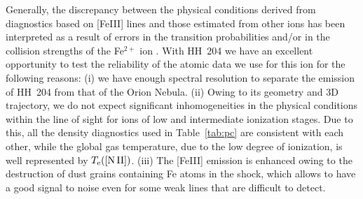 \documentclass[twocolumn]{aastex63}
\begin{document}
Generally, the discrepancy between the physical conditions derived from diagnostics based on [Fe\thinspace III] lines and those estimated from other ions has been interpreted as a result of errors in the transition probabilities and/or in the collision strengths of the Fe$^{2+}$ ion \citep[See the introduction of][]{laha17}. With HH~204 we have an excellent opportunity to test the reliability of the atomic data we use for this ion for the following reasons: (i) we have enough spectral resolution to separate the emission of HH~204 from that of the Orion Nebula. (ii) Owing to its geometry and 3D trajectory, we do not expect significant inhomogeneities in the physical conditions within the line of sight for ions of low and intermediate ionization stages. Due to this, all the density diagnostics used in Table~\ref{tab:pc} are consistent with each other, while the global gas temperature, due to the low degree of ionization, is well represented by $T_{\rm e}(\text{[N\thinspace II]})$. (iii) The [Fe\thinspace III] emission is enhanced owing to the destruction of dust grains containing Fe atoms in the shock, which allows to have a good signal to noise even for some weak lines that are difficult to detect. 
\end{document}
